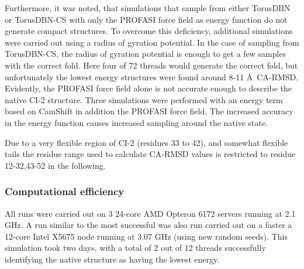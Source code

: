 Furthermore, it was noted, that simulations that sample from either TorusDBN or TorusDBN-CS with only the PROFASI force field as energy function do not generate compact structures.
To overcome this deficiency, additional simulations were carried out using a radius of gyration potential.
In the case of sampling from TorusDBN-CS, the radius of gyration potential is enough to get a few samples with the correct fold. Here four of 72 threads would generate the correct fold, but unfortunately the lowest energy structures were found around 8-11 \AA\ CA-RMSD. Evidently, the PROFASI force field alone is not accurate enough to describe the native CI-2 structure.
Three simulations were performed with an energy term based on CamShift in addition the PROFASI force field. The increased accuracy in the energy function causes increased sampling around the native state. 

Due to a very flexible region of CI-2 (residues 33 to 42), and somewhat flexible tails the residue range used to calculate CA-RMSD values is restricted to residue 12-32,43-52 in the following.


\subsubsection{Computational efficiency}
All runs were carried out on 3 24-core AMD Opteron 6172 servers running at 2.1 GHz. A run similar to the most successful was also run carried out on a faster a 12-core Intel X5675 node running at 3.07 GHz (using new random seeds).
This simulation took two days, with a total of 2 out of 12 threads successfully identifying the native structure as having the lowest energy.

